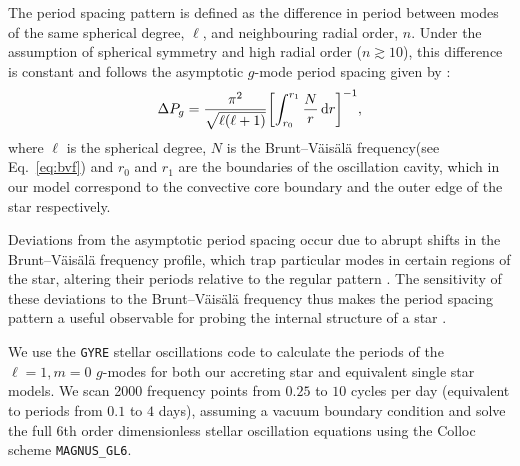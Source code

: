 \documentclass[twocolumn, twocolappendix, oneside]{aastex631}
\newcommand{\bvf}{Brunt–Väisälä frequency\xspace}
\newcommand{\gmode}{$g$-mode\xspace}
\newcommand{\gmodes}{$g$-modes\xspace}
\newcommand{\gyre}{\texttt{GYRE}\xspace}
\begin{document}
The period spacing pattern is defined as the difference in period between modes of the same spherical degree, $\ell$, and neighbouring radial order, $n$. Under the assumption of spherical symmetry and high radial order ($n \gtrsim 10$), this difference is constant and follows the asymptotic \gmode period spacing given by \citet{Tassoul+1980}:
\begin{equation}\label{eq:period-spacing}
    \Delta P_g = \frac{\pi^2}{\sqrt{\ell(\ell+1)}} \qty[\int_{r_0}^{r_1} \frac{N}{r} \dd{r}]^{-1},
\end{equation}
where $\ell$ is the spherical degree, $N$ is the \bvf (see Eq.~\ref{eq:bvf}) and $r_0$ and $r_1$ are the boundaries of the oscillation cavity, which in our model correspond to the convective core boundary and the outer edge of the star respectively.

Deviations from the asymptotic period spacing occur due to abrupt shifts in the \bvf profile, which trap particular modes in certain regions of the star, altering their periods relative to the regular pattern \citep[e.g.][]{Miglio+2008}. The sensitivity of these deviations to the \bvf thus makes the period spacing pattern a useful observable for probing the internal structure of a star \citep[e.g.][]{Aerts+2010}.

We use the \gyre stellar oscillations code \citep[version 7.1, ][]{Townsend+2013,Townsend+2018,Goldstein+2020,Sun+2023} to calculate the periods of the ${\ell = 1}, {m = 0}$ \gmodes for both our accreting star and equivalent single star models. We scan 2000 frequency points from $0.25$ to $10$ cycles per day (equivalent to periods from $0.1$ to $4$ days), assuming a vacuum boundary condition and solve the full 6th order dimensionless stellar oscillation equations \citep{Dziembowski+1971, Christensen-Dalsgaard+2008} using the Colloc scheme \texttt{MAGNUS\_GL6}.
\end{document}
